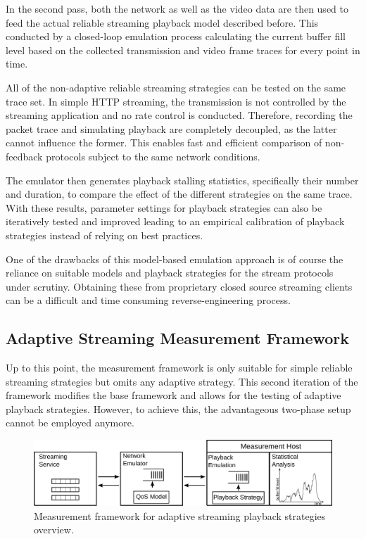 In the second pass, both the network as well as the video data are then used to feed the actual reliable streaming playback model described before. This conducted by a closed-loop emulation process calculating the current buffer fill level based on the collected transmission and video frame traces for every point in time. 

All of the non-adaptive reliable streaming strategies can be tested on the same trace set. In simple \gls{HTTP} streaming, the transmission is not controlled by the streaming application and no rate control is conducted. Therefore, recording the packet trace and simulating playback are completely decoupled, as the latter cannot influence the former. This enables fast and efficient comparison of non-feedback protocols subject to the same network conditions.

The emulator then generates playback stalling statistics, specifically their number and duration, to compare the effect of the different strategies on the same trace. With these results, parameter settings for playback strategies can also be iteratively tested and improved leading to an empirical calibration of playback strategies instead of relying on best practices.

One of the drawbacks of this model-based emulation approach is of course the reliance on suitable models and playback strategies for the stream protocols under scrutiny. Obtaining these from proprietary closed source streaming clients can be a difficult and time consuming reverse-engineering process.


\subsection{Adaptive Streaming Measurement Framework}

Up to this point, the measurement framework is only suitable for simple reliable streaming strategies but omits any adaptive strategy. This second iteration of the framework modifies the base framework and allows for the testing of adaptive playback strategies. However, to achieve this, the advantageous two-phase setup cannot be employed anymore.

\begin{figure}[htb]
	\includegraphics[width=1.0\textwidth]{images/feedback-measurement-model.pdf}
	\caption{Measurement framework for adaptive streaming playback strategies overview.}
\label{c3:fig:framework-feedback}
\end{figure}

